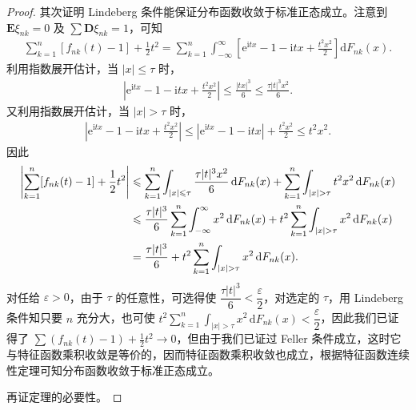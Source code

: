 \documentclass[../../main.tex]{subfiles}
\begin{document}
\begin{proof}
其次证明 Lindeberg 条件能保证分布函数收敛于标准正态成立。注意到 $\boldsymbol{E}\xi_{nk}=0$ 及 $\sum\boldsymbol{D}\xi_{nk}=1$，可知
\begin{align*}
\sum_{k=1}^{n}[f_{nk}(t)-1]+\frac12t^{2}
=\sum_{k=1}^{n}\int_{-\infty}^{\infty}\left[\mathrm{e}^{\mathrm{i}tx}-1-\mathrm{i}tx+\frac{t^{2}x^{2}}2\right]\mathrm{d}F_{nk}(x).
\end{align*}
利用指数展开估计，当 $|x|\leqslant\tau$ 时，
\begin{align*}
\left|\mathrm{e}^{\mathrm{i}tx}-1-\mathrm{i}tx+\frac{t^{2}x^{2}}2\right|\leqslant\frac{|tx|^{3}}6\leqslant\frac{\tau|t|^{3}x^{2}}6.
\end{align*}
又利用指数展开估计，当 $|x|>\tau$ 时，
\begin{align*}
\left|\mathrm{e}^{\mathrm{i}tx}-1-\mathrm{i}tx+\frac{t^{2}x^{2}}2\right|\leqslant|\mathrm{e}^{\mathrm{i}tx}-1-\mathrm{i}tx|+\frac{t^{2}x^{2}}2\leqslant t^{2}x^{2}.
\end{align*}
因此
\begin{align}
\left|\sum_{k=1}^{n}[f_{nk}(t)-1]+\frac12t^{2}\right|
&\leqslant\sum_{k=1}^{n}\int_{|x|\leqslant\tau}\frac{\tau|t|^{3}x^{2}}6\,\mathrm{d}F_{nk}(x)+\sum_{k=1}^{n}\int_{|x|>\tau}t^{2}x^{2}\,\mathrm{d}F_{nk}(x)\notag\\
&\leqslant\frac{\tau|t|^{3}}6\sum_{k=1}^{n}\int_{-\infty}^{\infty}x^{2}\,\mathrm{d}F_{nk}(x)+t^{2}\sum_{k=1}^{n}\int_{|x|>\tau}x^{2}\,\mathrm{d}F_{nk}(x)\notag\\
&=\frac{\tau|t|^{3}}6+t^{2}\sum_{k=1}^{n}\int_{|x|>\tau}x^{2}\,\mathrm{d}F_{nk}(x).
\end{align}
对任给 $\varepsilon>0$，由于 $\tau$ 的任意性，可选得使 $\dfrac{\tau|t|^{3}}6<\dfrac{\varepsilon}2$，对选定的 $\tau$，用 Lindeberg 条件知只要 $n$ 充分大，也可使 $t^{2}\sum_{k=1}^{n}\int_{|x|>\tau}x^{2}\,\mathrm{d}F_{nk}(x)<\dfrac{\varepsilon}2$，因此我们已证得了 $\sum(f_{nk}(t)-1)+\frac12t^{2}\to0$，但由于我们已证过 Feller 条件成立，这时它与特征函数乘积收敛是等价的，因而特征函数乘积收敛也成立，根据特征函数连续性定理可知分布函数收敛于标准正态成立。

再证定理的必要性。


\end{proof}
\end{document}
